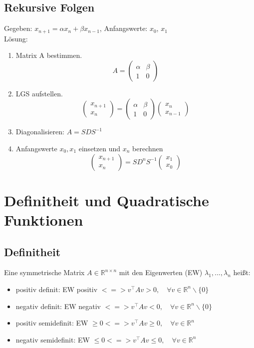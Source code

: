 \documentclass[german, 6pt]{latex4ei/latex4ei_sheet}
\begin{document}
\subsection{Rekursive Folgen}
Gegeben: $x_{n+1} = {\alpha} x_n + {\beta} x_{n-1}$, Anfangswerte: $x_0$, $x_1$\\
Lösung:\\
\begin{enumerate}
	\item Matrix A bestimmen. 
	\begin{equation*}
	A=\begin{pmatrix}
	{\alpha}&{\beta}\\
	1&0
	\end{pmatrix}
	\end{equation*}
	\item LGS aufstellen.
	\begin{equation*}
	\begin{pmatrix}
	x_{n+1}\\
	x_{n}\end{pmatrix}=\begin{pmatrix}
	{\alpha}&{\beta}\\
	1&0
	\end{pmatrix}
	\begin{pmatrix}
	x_{n}\\
	x_{n-1}\end{pmatrix}
	\end{equation*}
	\item Diagonalisieren: $A=SDS^{-1}$
	\item Anfangswerte $x_0, x_1$ einsetzen und $x_n$ berechnen
	\begin{equation*}
	\begin{pmatrix}
	x_{n+1}\\
	x_{n}\end{pmatrix}=SD^{n}S^{-1}
	\begin{pmatrix}
	x_{1}\\
	x_{0}\end{pmatrix}
	\end{equation*}
\end{enumerate}
\section{Definitheit und Quadratische Funktionen}
\subsection{Definitheit}
Eine symmetrische Matrix $A \in\mathbb R^{n\times n}$ mit den Eigenwerten (EW) $\lambda_1, ..., \lambda_n$ heißt:
\begin{itemize}\itemsep0pt
\item positiv definit: EW positiv $<=> v^{\top}Av> 0,\quad\forall v \in\mathbb R^n\backslash \{0\}$
\item negativ definit: EW negativ $<=> v^{\top}Av< 0,\quad\forall v \in\mathbb R^n\backslash \{0\}$
\item positiv semidefinit: EW $\geq 0 <=> v^{\top}Av\geq 0,\quad\forall v \in\mathbb R^n$
\item negativ semidefinit: EW $\leq 0 <=> v^{\top}Av\leq 0,\quad\forall v \in\mathbb R^n$
\end{itemize}
\end{document}
